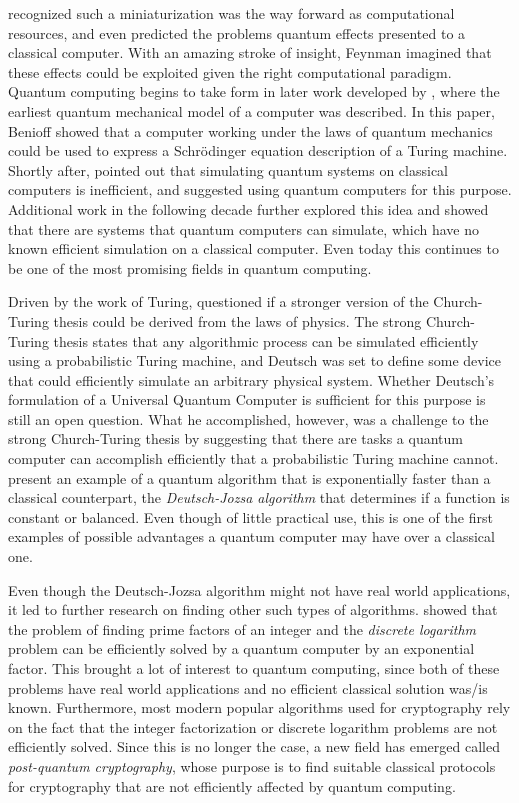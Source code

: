\documentclass[../../dissertation.tex]{subfiles}
\begin{document}
\cite{feynman1959} recognized such a miniaturization was the way forward as computational resources, and
even predicted the problems quantum effects presented to a classical computer.
With an amazing stroke of insight, Feynman imagined that these effects could
be exploited given the right computational paradigm. Quantum computing begins
to take form in later work developed by \cite{benioff1980}, where the earliest
quantum mechanical model of a computer was described. In this paper, Benioff
showed that a computer working under the laws of quantum mechanics could be
used to express a Schrödinger equation description of a Turing machine. Shortly
after, \cite{feynman1982} pointed out that simulating quantum systems on
classical computers is inefficient, and suggested using quantum computers for
this purpose. Additional work in the following decade further explored this
idea and showed that there are systems that quantum computers can simulate,
which have no known efficient simulation on a classical computer. Even
today this continues to be one of the most promising fields in quantum
computing.\par Driven by the work of Turing, \cite{deutsch1985} questioned if a
stronger version of the Church-Turing thesis could be derived from the laws of
physics. The strong Church-Turing thesis states that any algorithmic process
can be simulated efficiently using a probabilistic Turing machine, and Deutsch
was set to define some device that could efficiently simulate an arbitrary
physical system. Whether Deutsch's formulation of a Universal Quantum Computer
is sufficient for this purpose is still an open question. What he
accomplished, however, was a challenge to the strong Church-Turing thesis by suggesting
that there are tasks a quantum computer can accomplish efficiently that a
probabilistic Turing machine cannot. \cite{deutsch1992} present an example of a
quantum algorithm that is exponentially faster than a classical counterpart,
the \textit{Deutsch-Jozsa algorithm} that determines if a function is constant
or balanced. Even though of little practical use, this is one of the first
examples of possible advantages a quantum computer may have over a classical
one.\par

Even though the Deutsch-Jozsa algorithm might not have real world applications,
it led to further research on finding other such types of algorithms.
\cite{shor1994} showed that the problem of finding prime factors of an integer
and the \textit{discrete logarithm} problem can be efficiently solved by a
quantum computer by an exponential factor. This brought a lot of interest to
quantum computing, since both of these problems have real world applications
and no efficient classical solution was/is known. Furthermore, most modern
popular algorithms used for cryptography rely on the fact that the integer
factorization or discrete logarithm problems are not efficiently solved. Since
this is no longer the case, a new field has emerged called \textit{post-quantum
cryptography}, whose purpose is to find suitable classical protocols for
cryptography that are not efficiently affected by quantum computing.\par
\end{document}
